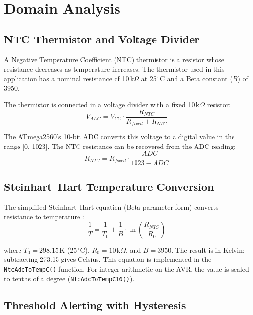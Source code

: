 \documentclass[12pt]{article}
\begin{document}
\section{Domain Analysis}

\subsection{NTC Thermistor and Voltage Divider}

A Negative Temperature Coefficient (NTC) thermistor is a resistor whose resistance decreases as temperature increases. The thermistor used in this application has a nominal resistance of 10\,k\(\Omega\) at 25\,\(^{\circ}\)C and a Beta constant (\(B\)) of 3950.

The thermistor is connected in a voltage divider with a fixed 10\,k\(\Omega\) resistor:
\begin{equation}
V_{ADC} = V_{CC} \cdot \frac{R_{NTC}}{R_{fixed} + R_{NTC}}
\label{eq:vdiv}
\end{equation}

The ATmega2560's 10-bit ADC converts this voltage to a digital value in the range [0, 1023]. The NTC resistance can be recovered from the ADC reading:
\begin{equation}
R_{NTC} = R_{fixed} \cdot \frac{ADC}{1023 - ADC}
\label{eq:rntc}
\end{equation}

\subsection{Steinhart--Hart Temperature Conversion}

The simplified Steinhart--Hart equation (Beta parameter form) converts resistance to temperature \cite{ntc_steinhart}:
\begin{equation}
\frac{1}{T} = \frac{1}{T_0} + \frac{1}{B} \cdot \ln\!\left(\frac{R_{NTC}}{R_0}\right)
\label{eq:steinhart}
\end{equation}

where \(T_0 = 298.15\)\,K (25\,\(^{\circ}\)C), \(R_0 = 10\)\,k\(\Omega\), and \(B = 3950\). The result is in Kelvin; subtracting 273.15 gives Celsius. This equation is implemented in the \texttt{NtcAdcToTempC()} function. For integer arithmetic on the AVR, the value is scaled to tenths of a degree (\texttt{NtcAdcToTempC10()}).

\subsection{Threshold Alerting with Hysteresis}
\end{document}
